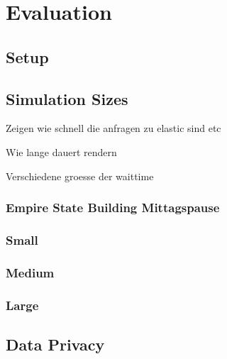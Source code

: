 \section{Evaluation}

\subsection{Setup}
\label{Setup}

\subsection{Simulation Sizes}
\label{Simulation Sizes}

Zeigen wie schnell die anfragen zu elastic sind etc

Wie lange dauert rendern

Verschiedene groesse der waittime

\subsubsection{Empire State Building Mittagspause}

\subsubsection{Small}
\label{Small}

\subsubsection{Medium}
\label{Medium}

\subsubsection{Large}
\label{Large}

\subsection{Data Privacy}
\label{Data Privacy}

\clearpage